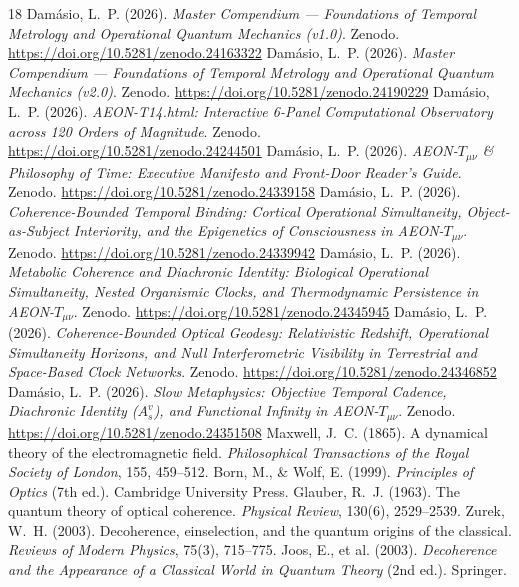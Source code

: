 \documentclass[11pt,a4paper]{article}
\begin{document}
\begin{thebibliography}{18}
 Dam\'asio, L.~P. (2026). \emph{Master Compendium --- Foundations of Temporal Metrology and Operational Quantum Mechanics (v1.0)}. Zenodo. \url{https://doi.org/10.5281/zenodo.24163322}
 Dam\'asio, L.~P. (2026). \emph{Master Compendium --- Foundations of Temporal Metrology and Operational Quantum Mechanics (v2.0)}. Zenodo. \url{https://doi.org/10.5281/zenodo.24190229}
 Dam\'asio, L.~P. (2026). \emph{AEON-T14.html: Interactive 6-Panel Computational Observatory across 120 Orders of Magnitude}. Zenodo. \url{https://doi.org/10.5281/zenodo.24244501}
 Dam\'asio, L.~P. (2026). \emph{AEON-$T_{\mu\nu}$ \& Philosophy of Time: Executive Manifesto and Front-Door Reader's Guide}. Zenodo. \url{https://doi.org/10.5281/zenodo.24339158}
 Dam\'asio, L.~P. (2026). \emph{Coherence-Bounded Temporal Binding: Cortical Operational Simultaneity, Object-as-Subject Interiority, and the Epigenetics of Consciousness in AEON-$T_{\mu\nu}$}. Zenodo. \url{https://doi.org/10.5281/zenodo.24339942}
 Dam\'asio, L.~P. (2026). \emph{Metabolic Coherence and Diachronic Identity: Biological Operational Simultaneity, Nested Organismic Clocks, and Thermodynamic Persistence in AEON-$T_{\mu\nu}$}. Zenodo. \url{https://doi.org/10.5281/zenodo.24345945}
 Dam\'asio, L.~P. (2026). \emph{Coherence-Bounded Optical Geodesy: Relativistic Redshift, Operational Simultaneity Horizons, and Null Interferometric Visibility in Terrestrial and Space-Based Clock Networks}. Zenodo. \url{https://doi.org/10.5281/zenodo.24346852}
 Dam\'asio, L.~P. (2026). \emph{Slow Metaphysics: Objective Temporal Cadence, Diachronic Identity ($A_s^v$), and Functional Infinity in AEON-$T_{\mu\nu}$}. Zenodo. \url{https://doi.org/10.5281/zenodo.24351508}
 Maxwell, J.~C. (1865). A dynamical theory of the electromagnetic field. \emph{Philosophical Transactions of the Royal Society of London}, 155, 459--512.
 Born, M., \& Wolf, E. (1999). \emph{Principles of Optics} (7th ed.). Cambridge University Press.
 Glauber, R.~J. (1963). The quantum theory of optical coherence. \emph{Physical Review}, 130(6), 2529--2539.
 Zurek, W.~H. (2003). Decoherence, einselection, and the quantum origins of the classical. \emph{Reviews of Modern Physics}, 75(3), 715--775.
 Joos, E., et al. (2003). \emph{Decoherence and the Appearance of a Classical World in Quantum Theory} (2nd ed.). Springer.

\end{thebibliography}
\end{document}
